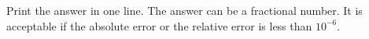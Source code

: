 Print the answer in one line. The answer can be a fractional number.
It is acceptable if the absolute error or the relative error is less than
$10^{-6}$. 
